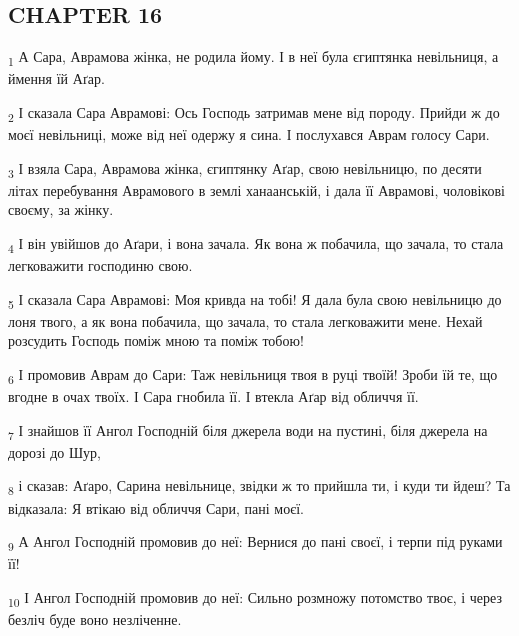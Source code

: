 \subsection{CHAPTER 16}
\begin{tcolorbox}
\textsubscript{1} А Сара, Аврамова жінка, не родила йому. І в неї була єгиптянка невільниця, а ймення їй Аґар.
\end{tcolorbox}
\begin{tcolorbox}
\textsubscript{2} І сказала Сара Аврамові: Ось Господь затримав мене від породу. Прийди ж до моєї невільниці, може від неї одержу я сина. І послухався Аврам голосу Сари.
\end{tcolorbox}
\begin{tcolorbox}
\textsubscript{3} І взяла Сара, Аврамова жінка, єгиптянку Аґар, свою невільницю, по десяти літах перебування Аврамового в землі ханаанській, і дала її Аврамові, чоловікові своєму, за жінку.
\end{tcolorbox}
\begin{tcolorbox}
\textsubscript{4} І він увійшов до Аґари, і вона зачала. Як вона ж побачила, що зачала, то стала легковажити господиню свою.
\end{tcolorbox}
\begin{tcolorbox}
\textsubscript{5} І сказала Сара Аврамові: Моя кривда на тобі! Я дала була свою невільницю до лоня твого, а як вона побачила, що зачала, то стала легковажити мене. Нехай розсудить Господь поміж мною та поміж тобою!
\end{tcolorbox}
\begin{tcolorbox}
\textsubscript{6} І промовив Аврам до Сари: Таж невільниця твоя в руці твоїй! Зроби їй те, що вгодне в очах твоїх. І Сара гнобила її. І втекла Аґар від обличчя її.
\end{tcolorbox}
\begin{tcolorbox}
\textsubscript{7} І знайшов її Ангол Господній біля джерела води на пустині, біля джерела на дорозі до Шур,
\end{tcolorbox}
\begin{tcolorbox}
\textsubscript{8} і сказав: Аґаро, Сарина невільнице, звідки ж то прийшла ти, і куди ти йдеш? Та відказала: Я втікаю від обличчя Сари, пані моєї.
\end{tcolorbox}
\begin{tcolorbox}
\textsubscript{9} А Ангол Господній промовив до неї: Вернися до пані своєї, і терпи під руками її!
\end{tcolorbox}
\begin{tcolorbox}
\textsubscript{10} І Ангол Господній промовив до неї: Сильно розмножу потомство твоє, і через безліч буде воно незліченне.
\end{tcolorbox}
